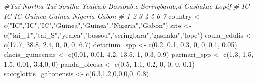 \documentclass[
]{book}
\newenvironment{Shaded}{\begin{snugshade}}{\end{snugshade}}
\newcommand{\CommentTok}[1]{\textcolor[rgb]{0.56,0.35,0.01}{\textit{#1}}}
\newcommand{\DecValTok}[1]{\textcolor[rgb]{0.00,0.00,0.81}{#1}}
\newcommand{\FloatTok}[1]{\textcolor[rgb]{0.00,0.00,0.81}{#1}}
\newcommand{\FunctionTok}[1]{\textcolor[rgb]{0.00,0.00,0.00}{#1}}
\newcommand{\NormalTok}[1]{#1}
\newcommand{\OtherTok}[1]{\textcolor[rgb]{0.56,0.35,0.01}{#1}}
\newcommand{\StringTok}[1]{\textcolor[rgb]{0.31,0.60,0.02}{#1}}
\begin{document}
\begin{Shaded}
\begin{Highlighting}[]
\CommentTok{\#Taï Northa Taï Southa  Yealéa,b    Bossoub,c   Seringbarab,d   Gashakae    Lopéf}
\CommentTok{\#                          IC       IC     IC        Guinea  Guinea      Nigeria    Gabon}
\CommentTok{\#                          1        2      3         4        5            6         7}
\NormalTok{country               }\OtherTok{\textless{}{-}} \FunctionTok{c}\NormalTok{(}\StringTok{"IC"}\NormalTok{,}\StringTok{"IC"}\NormalTok{,}\StringTok{"IC"}\NormalTok{,}\StringTok{"Guinea"}\NormalTok{,}\StringTok{"Guinea"}\NormalTok{,}\StringTok{"Nigeria"}\NormalTok{,}\StringTok{"Gabon"}\NormalTok{)}
\NormalTok{site                  }\OtherTok{\textless{}{-}} \FunctionTok{c}\NormalTok{(}\StringTok{"tai\_T"}\NormalTok{,}\StringTok{"tai\_S"}\NormalTok{,}\StringTok{"yealea"}\NormalTok{,}\StringTok{"bossou"}\NormalTok{,}\StringTok{"seringbara"}\NormalTok{,}\StringTok{"gashaka"}\NormalTok{,}\StringTok{"lope"}\NormalTok{)}
\NormalTok{coula\_edulis          }\OtherTok{\textless{}{-}} \FunctionTok{c}\NormalTok{(}\FloatTok{17.7}\NormalTok{, }\FloatTok{38.8}\NormalTok{, }\FloatTok{2.4}\NormalTok{,   }\DecValTok{0}\NormalTok{,    }\DecValTok{0}\NormalTok{,  }\DecValTok{0}\NormalTok{,   }\FloatTok{6.7}\NormalTok{)}
\NormalTok{detarium\_spp          }\OtherTok{\textless{}{-}} \FunctionTok{c}\NormalTok{(}\FloatTok{0.2}\NormalTok{,  }\FloatTok{0.1}\NormalTok{,  }\FloatTok{0.3}\NormalTok{,   }\DecValTok{0}\NormalTok{,    }\DecValTok{0}\NormalTok{,  }\FloatTok{0.1}\NormalTok{, }\FloatTok{0.05}\NormalTok{)}
\NormalTok{elaeis\_guineensis     }\OtherTok{\textless{}{-}} \FunctionTok{c}\NormalTok{(}\FloatTok{0.01}\NormalTok{, }\FloatTok{0.01}\NormalTok{, }\FloatTok{4.2}\NormalTok{,  }\FloatTok{13.5}\NormalTok{,  }\DecValTok{1}\NormalTok{,  }\FloatTok{0.3}\NormalTok{, }\FloatTok{0.9}\NormalTok{)}
\NormalTok{parinari\_spp          }\OtherTok{\textless{}{-}} \FunctionTok{c}\NormalTok{(}\FloatTok{1.3}\NormalTok{,   }\FloatTok{1.5}\NormalTok{,  }\FloatTok{1.5}\NormalTok{,   }\FloatTok{0.01}\NormalTok{, }\FloatTok{3.4}\NormalTok{,}\DecValTok{0}\NormalTok{,   }\DecValTok{0}\NormalTok{)}
\NormalTok{panda\_oleosa          }\OtherTok{\textless{}{-}} \FunctionTok{c}\NormalTok{(}\FloatTok{0.5}\NormalTok{,  }\FloatTok{1.1}\NormalTok{,  }\FloatTok{0.2}\NormalTok{,   }\DecValTok{0}\NormalTok{,      }\DecValTok{0}\NormalTok{,    }\DecValTok{0}\NormalTok{,  }\FloatTok{0.1}\NormalTok{)}
\NormalTok{sacoglottis\_gabonensis }\OtherTok{\textless{}{-}} \FunctionTok{c}\NormalTok{(}\FloatTok{6.3}\NormalTok{,}\FloatTok{1.2}\NormalTok{,}\DecValTok{0}\NormalTok{,}\DecValTok{0}\NormalTok{,}\DecValTok{0}\NormalTok{,}\DecValTok{0}\NormalTok{,    }\FloatTok{0.8}\NormalTok{)}


\end{Highlighting}
\end{Shaded}
\end{document}
